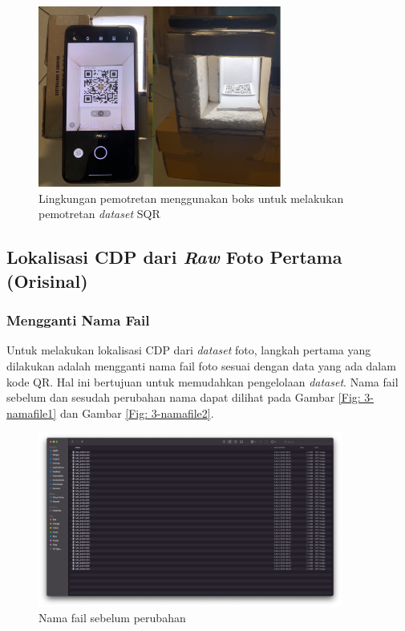 \begin{figure}[!h]
	\centering
	\includegraphics[width=8cm]{contents/chapter-3/3-environmentpemotretan.png}
	\caption{Lingkungan pemotretan menggunakan boks untuk melakukan pemotretan \emph{dataset} SQR}
	\label{Fig: 3-lingkunganpemotretan}
\end{figure}

\subsection{Lokalisasi CDP dari \emph{Raw} Foto Pertama (Orisinal)} \label{Lokalisasi CDP dari Raw Foto Pertama (Orisinal)}
\subsubsection{Mengganti Nama Fail}
Untuk melakukan lokalisasi CDP dari \emph{dataset} foto, langkah pertama yang dilakukan adalah mengganti nama fail foto sesuai dengan data yang ada dalam kode
QR. Hal ini bertujuan untuk memudahkan pengelolaan \emph{dataset}. Nama fail sebelum dan sesudah perubahan nama dapat dilihat pada Gambar \ref{Fig:
	3-namafile1} dan Gambar \ref{Fig: 3-namafile2}.

\begin{figure}[h]
	\centering
	\includegraphics[width=10cm]{contents/chapter-3/3-namafile1.png}
	\caption{Nama fail sebelum perubahan}
	\label{Fig: 3-namafile1}
\end{figure}

